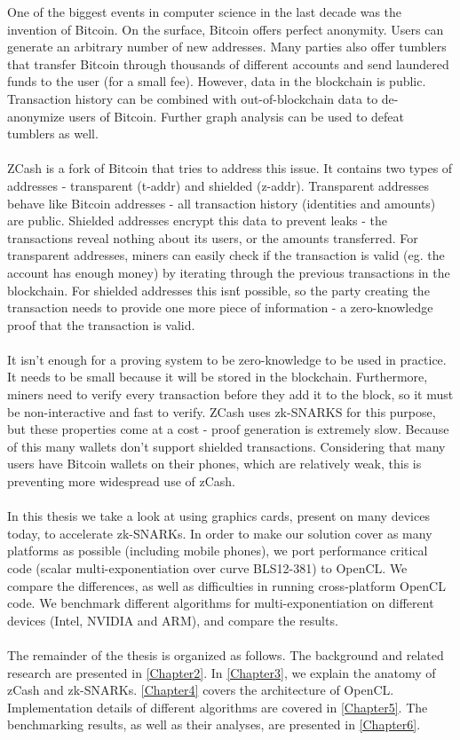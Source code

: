 One of the biggest events in computer science in the last decade was the invention of Bitcoin\cite{nakamoto2008bitcoin}. On the surface, Bitcoin offers perfect anonymity. Users can generate an arbitrary number of new addresses. Many parties also offer tumblers that transfer Bitcoin through thousands of different accounts and send laundered funds to the user (for a small fee). However, data in the blockchain is public. Transaction history can be combined with out-of-blockchain data to de-anonymize users of Bitcoin\cite{biryukov2014deanonymisation}. Further graph analysis can be used to defeat tumblers as well\cite{de2017analysis}.\\
\\
ZCash\cite{zcashprotocol} is a fork of Bitcoin that tries to address this issue. It contains two types of addresses - transparent (t-addr) and shielded (z-addr). Transparent addresses behave like Bitcoin addresses - all transaction history (identities and amounts) are public. Shielded addresses encrypt this data to prevent leaks - the transactions reveal nothing about its users, or the amounts transferred. For transparent addresses, miners can easily check if the transaction is valid (eg. the account has enough money) by iterating through the previous transactions in the blockchain. For shielded addresses this isn\'t possible, so the party creating the transaction needs to provide one more piece of information - a zero-knowledge proof that the transaction is valid. \\
\\
It isn't enough for a proving system to be zero-knowledge to be used in practice. It needs to be small because it will be stored in the blockchain. Furthermore, miners need to verify every transaction before they add it to the block, so it must be non-interactive and fast to verify. ZCash uses zk-SNARKS for this purpose, but these properties come at a cost - proof generation is extremely slow.
Because of this many wallets don't support shielded transactions. Considering that many users have Bitcoin wallets on their phones, which are relatively weak, this is preventing more widespread use of zCash.\\
\\
In this thesis we take a look at using graphics cards, present on many devices today, to accelerate zk-SNARKs. In order to make our solution cover as many platforms as possible (including mobile phones), we port performance critical code (scalar multi-exponentiation over curve BLS12-381) to OpenCL\cite{stone2010opencl}. We compare the differences, as well as difficulties in running cross-platform OpenCL code. We benchmark different algorithms for multi-exponentiation on different devices (Intel, NVIDIA and ARM), and compare the results.\\
\\
The remainder of the thesis is organized as follows. The background and related research are presented in \ref{Chapter2}. In \ref{Chapter3}, we explain the anatomy of zCash and zk-SNARKs. \ref{Chapter4} covers the architecture of OpenCL. Implementation details of different algorithms are covered in \ref{Chapter5}. The benchmarking results, as well as their analyses, are presented in \ref{Chapter6}.
